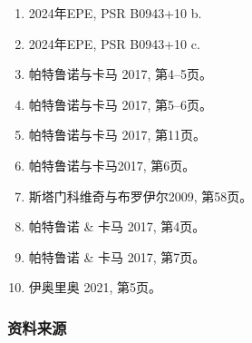 \begin{enumerate}
\item 2024年EPE, PSR B0943+10 b.
\item 2024年EPE, PSR B0943+10 c.
\item 帕特鲁诺与卡马 2017, 第4–5页。
\item 帕特鲁诺与卡马 2017, 第5–6页。
\item 帕特鲁诺与卡马 2017, 第11页。
\item 帕特鲁诺与卡马2017, 第6页。
\item 斯塔门科维奇与布罗伊尔2009, 第58页。
\item 帕特鲁诺 & 卡马 2017, 第4页。
\item 帕特鲁诺 & 卡马 2017, 第7页。
\item 伊奥里奥 2021, 第5页。
\end{enumerate}
\subsubsection{资料来源}
